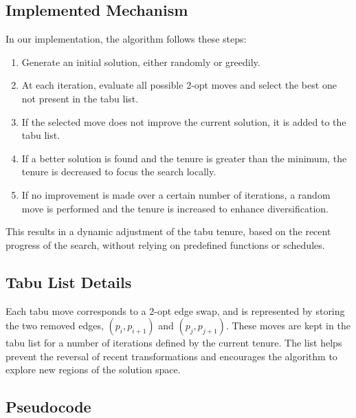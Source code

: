 \subsection{Implemented Mechanism}

In our implementation, the algorithm follows these steps:

\begin{enumerate}
    \item Generate an initial solution, either randomly or greedily.
    \item At each iteration, evaluate all possible 2-opt moves and select the best one not present in the tabu list.
    \item If the selected move does not improve the current solution, it is added to the tabu list.
    \item If a better solution is found and the tenure is greater than the minimum, the tenure is decreased to focus the search locally.
    \item If no improvement is made over a certain number of iterations, a random move is performed and the tenure is increased to enhance diversification.
\end{enumerate}

This results in a dynamic adjustment of the tabu tenure, based on the recent progress of the search, without relying on predefined functions or schedules.

\subsection{Tabu List Details}

Each tabu move corresponds to a 2-opt edge swap, and is represented by storing the two removed edges, $(p_i, p_{i+1})$ and $(p_j, p_{j+1})$. 
These moves are kept in the tabu list for a number of iterations defined by the current tenure. The list helps prevent the reversal of recent transformations 
and encourages the algorithm to explore new regions of the solution space.

\subsection{Pseudocode}

